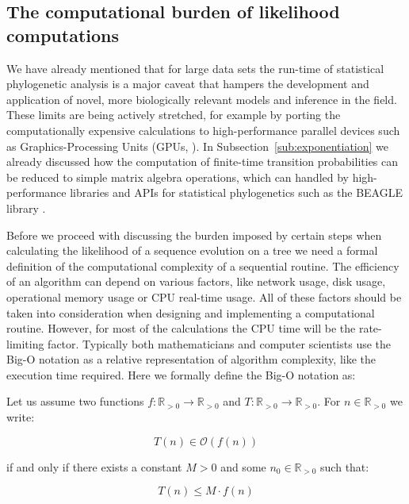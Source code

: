 
\subsection{The computational burden of likelihood computations}

We have already mentioned that for large data sets the run-time of statistical phylogenetic analysis is a major caveat that hampers the development and application of novel, more biologically relevant models and inference in the field.
These limits are being actively stretched, for example by porting the computationally expensive calculations to high-performance parallel devices such as Graphics-Processing Units (GPUs, \cite{Nickolls2008}).
In Subsection~\ref{sub:exponentiation} we already discussed how the computation of finite-time transition probabilities can be reduced to simple matrix algebra operations, which can handled by high-performance libraries and APIs for statistical phylogenetics such as the BEAGLE library \citep{Ayres2012, Suchard2009}. 

Before we proceed with discussing the burden imposed by certain steps when calculating the likelihood of a sequence evolution on a tree we need a formal definition of the computational complexity of a sequential routine.
The efficiency of an algorithm can depend on various factors, like network usage, disk usage, operational memory usage or CPU real-time usage.
All of these factors should be taken into consideration when designing and implementing a computational routine. 
However, for most of the calculations the CPU time will be the rate-limiting factor.
Typically both mathematicians and computer scientists use the Big-O notation as a relative representation of algorithm complexity, like the execution time required.
Here we formally define the Big-O notation as:

\begin{definition}
Let us assume two functions $f:\mathbb{R}_{>0}\rightarrow\mathbb{R}_{>0}$ and $T:\mathbb{R}_{>0}\rightarrow\mathbb{R}_{>0}$. 
For $n \in \mathbb{R}_{>0}$ we write:

\begin{equation}
T(n) \in \mathcal{O}\left(f(n)\right)
\label{eq:bigOh}
\end{equation}

\noindent
if and only if there exists a constant $M>0$ and some $n_0 \in \mathbb{R}_{>0}$ such that:

\begin{equation}
T(n)\leq M \cdot f(n)
\end{equation}
\end{definition}


